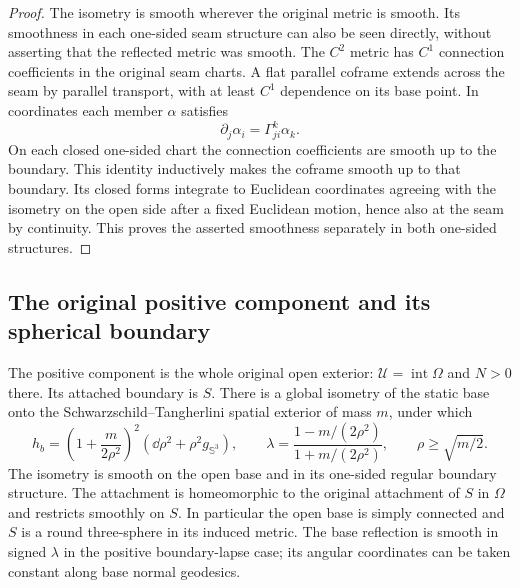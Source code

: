 \begin{proof}
The isometry is smooth wherever the original metric is smooth.
Its smoothness in each one-sided seam structure can also be seen
directly, without asserting that the reflected metric was smooth.
The $C^2$ metric has $C^1$ connection coefficients in the original
seam charts.  A flat parallel coframe extends across the seam by
parallel transport, with at least $C^1$ dependence on its base point.
In coordinates each member $\alpha$ satisfies
\[
 \partial_j\alpha_i=\Gamma^k_{ji}\alpha_k.
\]
On each closed one-sided chart the connection coefficients are smooth
up to the boundary.  This identity inductively makes the coframe
smooth up to that boundary.  Its closed forms integrate to Euclidean
coordinates agreeing with the isometry on the open side after a fixed
Euclidean motion, hence also at the seam by continuity.  This proves
the asserted smoothness separately in both one-sided structures.
\end{proof}

\newpage
\subsection{The original positive component and its spherical boundary}

\begin{proposition}
\label{rig4:cla:static-classification}
The positive component is the whole original open exterior:
$\mathcal U=\operatorname{int}\Omega$ and $N>0$ there.
Its attached boundary is $S$.  There is a global isometry of the
static base onto the Schwarzschild--Tangherlini spatial exterior of
mass $m$, under which
\begin{equation}\label{rig4:cla:ST-base}
 h_b=\left(1+\frac{m}{2\rho^2}\right)^2
          (\dd\rho^2+\rho^2 g_{\mathbb S^3}),\qquad
 \lambda=\frac{1-m/(2\rho^2)}{1+m/(2\rho^2)},
 \qquad \rho\ge\sqrt{m/2}.
\end{equation}
The isometry is smooth on the open base and in its one-sided regular
boundary structure.  The attachment is homeomorphic to the original
attachment of $S$ in $\Omega$ and restricts smoothly on $S$.
In particular the open base is simply connected and $S$ is a round
three-sphere in its induced metric.  The base reflection is smooth
in signed $\lambda$ in the positive boundary-lapse case; its angular
coordinates can be taken constant along base normal geodesics.
\end{proposition}

